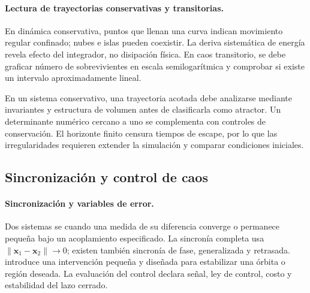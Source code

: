 \paragraph{Lectura de trayectorias conservativas y transitorias.}
En dinámica conservativa, puntos que llenan una curva indican movimiento regular
confinado; nubes e islas pueden coexistir. La deriva sistemática de energía revela
efecto del integrador, no disipación física. En caos transitorio, se debe graficar
número de sobrevivientes en escala semilogarítmica y comprobar si existe un intervalo
aproximadamente lineal.

\begin{warningbox}
En un sistema conservativo, una trayectoria acotada debe analizarse mediante invariantes y estructura de volumen antes de clasificarla como atractor. Un determinante
numérico cercano a uno se complementa con controles de conservación. El horizonte finito
censura tiempos de escape, por lo que las irregularidades requieren extender la simulación y comparar condiciones iniciales.
\end{warningbox}


\subsection{Sincronización y control de caos}

\paragraph{Sincronización y variables de error.}
Dos sistemas se  cuando una medida de su diferencia converge o
permanece pequeña bajo un acoplamiento especificado. La sincronía completa usa
\(\|\mathbf x_1-\mathbf x_2\|\to0\); existen también sincronía de fase, generalizada
y retrasada.  introduce una intervención pequeña y diseñada
para estabilizar una órbita o región deseada. La evaluación del control declara señal, ley de control, costo y estabilidad del lazo cerrado.

